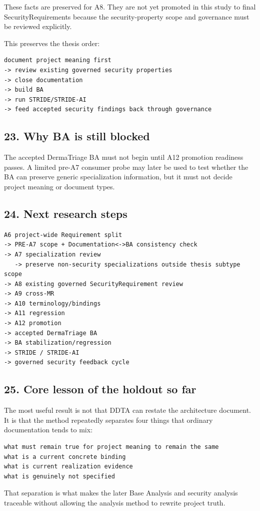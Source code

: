 \documentclass[11pt,a4paper]{article}
\begin{document}
These facts are preserved for A8. They are not yet promoted in this
study to final SecurityRequirements because the security-property scope
and governance must be reviewed explicitly.

This preserves the thesis order:

\begin{verbatim}
document project meaning first
-> review existing governed security properties
-> close documentation
-> build BA
-> run STRIDE/STRIDE-AI
-> feed accepted security findings back through governance
\end{verbatim}

\subsection{23. Why BA is still
blocked}\label{23-why-ba-is-still-blocked}

The accepted DermaTriage BA must not begin until A12 promotion readiness
passes. A limited pre-A7 consumer probe may later be used to test
whether the BA can preserve generic specialization information, but it
must not decide project meaning or document types.

\subsection{24. Next research steps}\label{24-next-research-steps}

\begin{verbatim}
A6 project-wide Requirement split
-> PRE-A7 scope + Documentation<->BA consistency check
-> A7 specialization review
   -> preserve non-security specializations outside thesis subtype scope
-> A8 existing governed SecurityRequirement review
-> A9 cross-MR
-> A10 terminology/bindings
-> A11 regression
-> A12 promotion
-> accepted DermaTriage BA
-> BA stabilization/regression
-> STRIDE / STRIDE-AI
-> governed security feedback cycle
\end{verbatim}

\subsection{25. Core lesson of the holdout so
far}\label{25-core-lesson-of-the-holdout-so-far}

The most useful result is not that DDTA can restate the architecture
document. It is that the method repeatedly separates four things that
ordinary documentation tends to mix:

\begin{verbatim}
what must remain true for project meaning to remain the same
what is a current concrete binding
what is current realization evidence
what is genuinely not specified
\end{verbatim}

That separation is what makes the later Base Analysis and security
analysis traceable without allowing the analysis method to rewrite
project truth.
\end{document}

